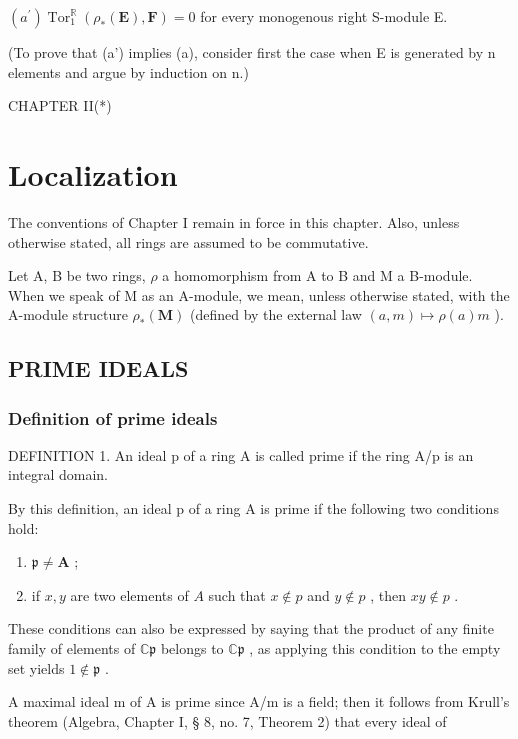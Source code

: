 \((a^{\prime})\operatorname{Tor}_{1}^{\mathbb{R}}(\rho_{*}(\mathbf{E}),\mathbf{F}) = 0\) for every monogenous right S-module E.

(To prove that (a') implies (a), consider first the case when E is generated by n elements and argue by induction on n.)

CHAPTER II(*)

\chapter{Localization}

The conventions of Chapter I remain in force in this chapter. Also, unless otherwise stated, all rings are assumed to be commutative.

Let A, B be two rings, \(\rho\) a homomorphism from A to B and M a B-module. When we speak of M as an A-module, we mean, unless otherwise stated, with the A-module structure \(\rho_{*}(\mathbf{M})\) (defined by the external law \((a,m)\mapsto\rho(a)m\) ).

\section{PRIME IDEALS}

\subsection{Definition of prime ideals}

DEFINITION 1. An ideal p of a ring A is called prime if the ring A/p is an integral domain.

By this definition, an ideal p of a ring A is prime if the following two conditions hold:

\begin{enumerate}
\def\labelenumi{(\arabic{enumi})}
\item
  \(\mathfrak{p} \neq \mathbf{A}\) ;
\item
  if \(x, y\) are two elements of \(A\) such that \(x \notin p\) and \(y \notin p\) , then \(xy \notin p\) .
\end{enumerate}

These conditions can also be expressed by saying that the product of any finite family of elements of \(\mathbb{C}\mathfrak{p}\) belongs to \(\mathbb{C}\mathfrak{p}\) , as applying this condition to the empty set yields \(1\notin\mathfrak{p}\) .

A maximal ideal m of A is prime since A/m is a field; then it follows from Krull's theorem (Algebra, Chapter I, § 8, no. 7, Theorem 2) that every ideal of

